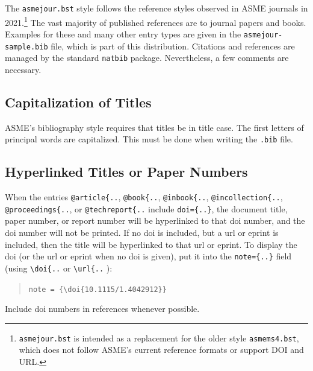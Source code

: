 \documentclass[subscriptcorrection,upint,varvw,barcolor=Goldenrod3,mathalfa=cal=euler,balance,hyphenate,french,pdf-a]{asmejour} %
\begin{document}
The {\upshape\texttt{asmejour.bst}}  style follows the reference styles observed in ASME journals in 2021.\footnote{\texttt{asmejour.bst} is intended as a replacement for the older style \texttt{asmems4.bst}, which does not follow ASME's current reference formats or support DOI and URL.} The vast majority of published references are to journal papers and books. Examples for these and many other entry types are given in the \texttt{asmejour-sample.bib} file, which is part of this distribution. Citations and references are managed by the standard \texttt{natbib} package.
Nevertheless, a few comments are necessary. 

\subsection{Capitalization of Titles} ASME's bibliography style requires that titles be in title case. The first letters of principal words are capitalized. This must be done when writing the \texttt{.bib} file.

\subsection{Hyperlinked Titles or Paper Numbers} When the entries \verb|@article{..|, \verb|@book{..|, \verb|@inbook{..|, \verb|@incollection{..|, \verb|@proceedings{..|, or \verb|@techreport{..| include \verb|doi={..}|, the document title, paper number, or report number will be hyperlinked to that doi number, and the doi number will not be printed. If no doi is included, but a url or eprint is included, then the title will be hyperlinked to that url or eprint. To display the doi (or the url or eprint when no doi is given), put it into the \verb|note={..}| field (using \verb|\doi{..| or \verb|\url{..| ):
\begin{quote}
\verb|note = {\doi{10.1115/1.4042912}}|
\end{quote}
Include doi numbers in references whenever possible.



\begin{table}[t]
\caption{A simple table\label{tab:1}}
%
\end{table}
\end{document}
